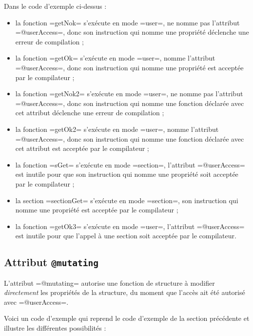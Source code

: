 Dans le code d'exemple ci-dessus :
\begin{itemize}
  \item la fonction \omnibus=getNok= s'exécute en mode \omnibus=user=, ne nomme pas l'attribut \omnibus=@userAccess=, donc son instruction qui nomme une propriété déclenche une erreur de compilation ;
  \item la fonction \omnibus=getOk= s'exécute en mode \omnibus=user=, nomme l'attribut \omnibus=@userAccess=, donc son instruction qui nomme une propriété est acceptée par le compilateur ;
  \item la fonction \omnibus=getNok2= s'exécute en mode \omnibus=user=, ne nomme pas l'attribut \omnibus=@userAccess=, donc son instruction qui nomme une fonction déclarée avec cet attribut déclenche une erreur de compilation ;
  \item la fonction \omnibus=getOk2= s'exécute en mode \omnibus=user=, nomme l'attribut \omnibus=@userAccess=, donc son instruction qui nomme une fonction déclarée avec cet attribut est acceptée par le compilateur ;
  \item la fonction \omnibus=sGet= s'exécute en mode \omnibus=section=, l'attribut \omnibus=@userAccess= est inutile pour que son instruction qui nomme une propriété soit acceptée par le compilateur ;
  \item la section \omnibus=sectionGet= s'exécute en mode \omnibus=section=, son instruction qui nomme une propriété est acceptée par le compilateur ;
  \item la fonction \omnibus=getOk3= s'exécute en mode \omnibus=user=, l'attribut \omnibus=@userAccess= est inutile pour que l'appel à une section soit acceptée par le compilateur.
\end{itemize}



\subsection{Attribut \texttt{@mutating}}

L'attribut \omnibus=@mutating= autorise une fonction de structure à modifier \emph{directement} les propriétés de la structure, du moment que l'accès ait été autorisé avec \omnibus=@userAccess=.

Voici un code d'exemple qui reprend le code d'exemple de la section précédente et illustre les différentes possibilités :

